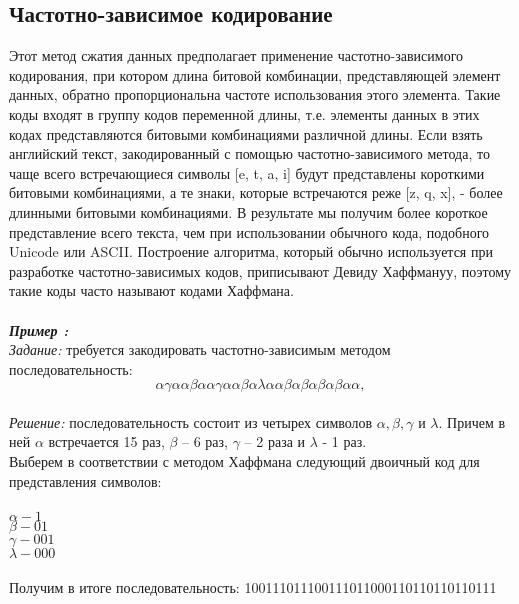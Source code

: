 \subsection{Частотно-зависимое кодирование}
Этот метод сжатия данных предполагает применение частотно-зависимого кодирования, при котором длина битовой комбинации, представляющей элемент данных, обратно пропорциональна частоте использования этого элемента. Такие коды входят в группу кодов переменной длины, т.е. элементы данных в этих кодах представляются битовыми комбинациями различной длины. Если взять английский текст, закодированный с помощью частотно-зависимого метода, то чаще всего встречающиеся символы [e, t, a, i] будут представлены короткими битовыми комбинациями, а те знаки, которые встречаются реже [z, q, x], - более длинными битовыми комбинациями. В результате мы получим более короткое представление всего текста, чем при использовании обычного кода, подобного Unicode или ASCII. Построение алгоритма, который обычно используется при разработке частотно-зависимых кодов, приписывают Девиду Хаффмануу, поэтому такие коды часто называют кодами Хаффмана.\\
\\\emph{\textbf{Пример :}}
\\\emph{Задание:} требуется закодировать частотно-зависимым методом последовательность:\\ $$\alpha\gamma\alpha\alpha\beta\alpha\alpha\gamma\alpha\alpha\beta\alpha\lambda\alpha\alpha\beta\alpha\beta\alpha\beta\alpha\beta\alpha\alpha,$$
\\\emph{Решение:} последовательность состоит из четырех символов $\alpha, \beta, \gamma$ и $\lambda$. Причем в ней $\alpha$ встречается 15 раз, $\beta$ -- 6 раз, $\gamma$ -- 2 раза и $\lambda$ - 1 раз.\\
Выберем в соответствии с методом Хаффмана следующий двоичный код для представления символов:\\
\\$\alpha - 1$
\\$\beta - 01$
\\$\gamma - 001$
\\$\lambda - 000$\\
\\Получим в итоге последовательность: 100111011100111011000110110110110111
